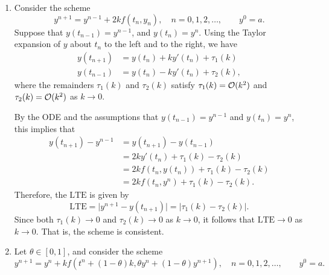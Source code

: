 \documentclass{homework}
\begin{document}
\begin{enumerate}
		\item Consider the scheme
		\begin{equation}
			y^{n+1} = y^{n-1} + 2kf(t_n, y_n),\quad n = 0, 1, 2, \dots, \qquad y^0 = a.
		\end{equation}
		Suppose that $y(t_{n-1}) = y^{n-1}$, and $y(t_n) = y^n$. Using the Taylor expansion of $y$ about $t_n$ to the left and to the right, we have
		\begin{align*}
			y(t_{n+1}) &= y(t_n) + ky'(t_n) + \tau_1(k) \\
			y(t_{n-1}) &= y(t_n) - ky'(t_n) + \tau_2(k),
		\end{align*}
		where the remainders $\tau_1(k)$ and $\tau_2(k)$ satisfy $\tau_1(k) = \mathcal{O}(k^2)$ and $\tau_2(k) = \mathcal{O}(k^2)$ as $k \to 0$.
		
		By the ODE and the assumptions that $y(t_{n-1}) = y^{n-1}$ and $y(t_n) = y^n$, this implies that
		\begin{align*}
			y(t_{n+1}) - y^{n-1} &= y(t_{n+1}) -y(t_{n-1}) \\
			&= 2ky'(t_n) +\tau_1(k) - \tau_2(k) \\
			&= 2kf(t_n, y(t_n)) + \tau_1(k) - \tau_2(k) \\
			&= 2kf(t_n, y^n) + \tau_1(k) - \tau_2(k).
		\end{align*}
		Therefore, the $\text{LTE}$ is given by
		\begin{equation*}
			\text{LTE} = \big|y^{n+1} - y(t_{n+1})\big| = |\tau_1(k) - \tau_2(k)|.
		\end{equation*}
		Since both $\tau_1(k) \to 0$ and $\tau_2(k) \to 0$ as $k\to 0$, it follows that $\text{LTE}\to 0$ as $k\to0$. That is, the scheme is consistent.
		
		\item Let $\theta \in [0,1]$, and consider the scheme
		\begin{equation}
			y^{n+1} = y^n + kf\left(t^n + (1-\theta)k, \theta y^n + (1-\theta)y^{n+1}\right),\quad n = 0, 1, 2, \dots, \qquad y^0 = a.
		\end{equation}
		

\end{enumerate}
\end{document}
